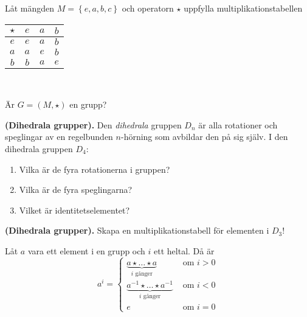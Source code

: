 \documentclass[11pt,fleqn]{book} %
\begin{document}
\begin{problem}
  Låt mängden \(M = \left\{e, a, b, c\right\}\) och operatorn \(\star\) uppfylla multiplikationstabellen \\
  { \center
  \begin{tabular}{c|ccc}
    \( \star \) & \(e\) & \(a\) & \(b\) \\ \midrule
    \(e\) & \(e\) & \(a\) & \(b\) \\
    \(a\) & \(a\) & \(e\) & \(b\) \\
    \(b\) & \(b\) & \(a\) & \(e\) \\
  \end{tabular} \\ }
  Är \(G = (M, \star )\) en grupp?
\end{problem}


\begin{problem} \textbf{(Dihedrala grupper).} Den \textit{dihedrala} gruppen \(D_n\) är alla rotationer och speglingar av en regelbunden \(n\)-hörning som avbildar den på sig själv. I den dihedrala gruppen \(D_4\):
  \begin{enumerate}[label=\textbf{(\alph*)}]
    \item Vilka är de fyra rotationerna i gruppen?
    \item Vilka är de fyra speglingarna?
    \item Vilket är identitetselementet?
  \end{enumerate}
\end{problem}

\begin{problem} \textbf{(Dihedrala grupper).} Skapa en multiplikationstabell för elementen i \(D_3\)! %
\end{problem}

\begin{definition}
  Låt \(a\) vara ett element i en grupp och \(i\) ett heltal. Då är
  \[
    a ^ i =
    \begin{cases}
      \underbrace{a  \star \dots  \star a}_{i \text{ gånger} } &\text{ om } i > 0 \\
      \underbrace{a ^{-1}  \star \dots  \star a ^{-1}}_{i \text{ gånger} } &\text{ om } i < 0 \\
      e &\text{ om } i = 0
    \end{cases} 
  \]
\end{definition}
\end{document}

